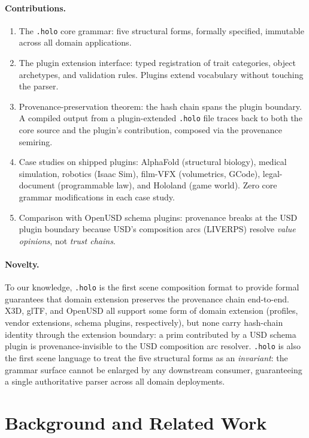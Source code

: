 \documentclass[sigconf,nonacm]{acmart}
\newcommand{\holo}{\texttt{.holo}}
\begin{document}
\paragraph{Contributions.}
\begin{enumerate}
  \item The \holo{} core grammar: five structural forms, formally
    specified, immutable across all domain applications.
  \item The plugin extension interface: typed registration of trait
    categories, object archetypes, and validation rules. Plugins
    extend vocabulary without touching the parser.
  \item Provenance-preservation theorem: the hash chain spans the
    plugin boundary. A compiled output from a plugin-extended
    \holo{} file traces back to both the core source and the
    plugin's contribution, composed via the provenance semiring.
  \item Case studies on shipped plugins: AlphaFold (structural
    biology), medical simulation, robotics (Isaac Sim), film-VFX
    (volumetrics, GCode), legal-document (programmable law), and
    Hololand (game world). Zero core grammar modifications in each case study.
  \item Comparison with OpenUSD schema plugins: provenance breaks
    at the USD plugin boundary because USD's composition arcs
    (LIVERPS) resolve \emph{value opinions}, not \emph{trust
    chains}.
\end{enumerate}

\paragraph{Novelty.}
To our knowledge, \holo{} is the first scene composition format to
provide formal guarantees that domain extension preserves the
provenance chain end-to-end. X3D, glTF, and OpenUSD all support
some form of domain extension (profiles, vendor extensions, schema
plugins, respectively), but none carry hash-chain identity through
the extension boundary: a prim contributed by a USD schema plugin
is provenance-invisible to the USD composition arc resolver.
\holo{} is also the first scene language to treat the five
structural forms as an \emph{invariant}: the grammar surface cannot
be enlarged by any downstream consumer, guaranteeing a single
authoritative parser across all domain deployments.

\section{Background and Related Work}
\label{sec:related}
\end{document}
